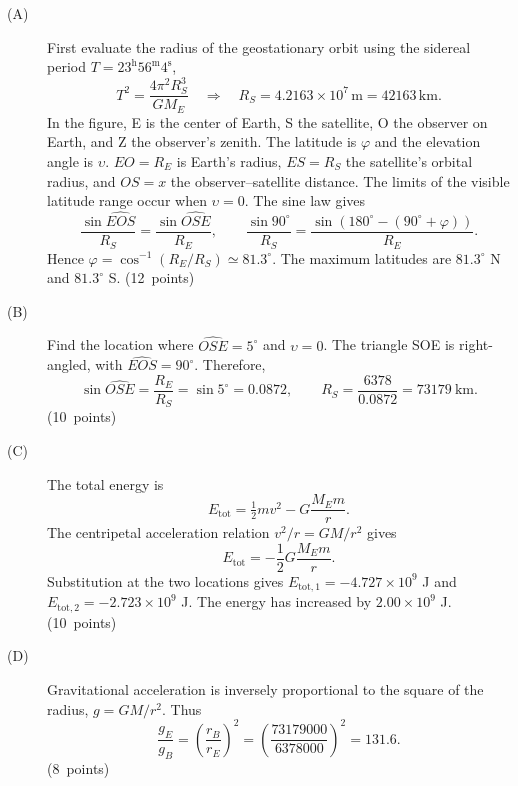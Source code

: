 \begin{description}
\item[(A)] First evaluate the radius of the geostationary orbit using the sidereal period
$T=23^{\mathrm h}56^{\mathrm m}4^{\mathrm s}$,
\[
T^2=\frac{4\pi^2R_S^3}{GM_E}\quad\Longrightarrow\quad R_S=4.2163\times10^7\,\mathrm{m}=42163\,\mathrm{km}.
\]
In the figure, E is the center of Earth, S the satellite, O the observer on Earth, and Z the observer's zenith.
The latitude is $\varphi$ and the elevation angle is $\upsilon$.
$EO=R_E$ is Earth's radius, $ES=R_S$ the satellite's orbital radius, and $OS=x$ the observer--satellite distance.
The limits of the visible latitude range occur when $\upsilon=0$. The sine law gives
\[
\frac{\sin\widehat{EOS}}{R_S}=\frac{\sin\widehat{OSE}}{R_E},
\qquad
\frac{\sin90^\circ}{R_S}=\frac{\sin(180^\circ-(90^\circ+\varphi))}{R_E}.
\]
Hence $\varphi=\cos^{-1}(R_E/R_S)\simeq81.3^\circ$.
The maximum latitudes are $81.3^\circ$ N and $81.3^\circ$ S. \hfill\mbox{(12 points)}
\item[(B)] Find the location where $\widehat{OSE}=5^\circ$ and $\upsilon=0$.
The triangle SOE is right-angled, with $\widehat{EOS}=90^\circ$. Therefore,
\[
\sin\widehat{OSE}=\frac{R_E}{R_S}=\sin5^\circ=0.0872,
\qquad R_S=\frac{6378}{0.0872}=73179\ \mathrm{km}.
\]
\hfill\mbox{(10 points)}
\item[(C)] The total energy is
\[
E_{\mathrm{tot}}=\tfrac12mv^2-G\frac{M_Em}{r}.
\]
The centripetal acceleration relation $v^2/r=GM/r^2$ gives
\[
E_{\mathrm{tot}}=-\frac12G\frac{M_Em}{r}.
\]
Substitution at the two locations gives $E_{\mathrm{tot},1}=-4.727\times10^9$ J and
$E_{\mathrm{tot},2}=-2.723\times10^9$ J. The energy has increased by $2.00\times10^9$ J. \hfill\mbox{(10 points)}
\item[(D)] Gravitational acceleration is inversely proportional to the square of the radius,
$g=GM/r^2$. Thus
\[
\frac{g_E}{g_B}=\left(\frac{r_B}{r_E}\right)^2
=\left(\frac{73179000}{6378000}\right)^2=131.6.
\]
\hfill\mbox{(8 points)}
\end{description}
